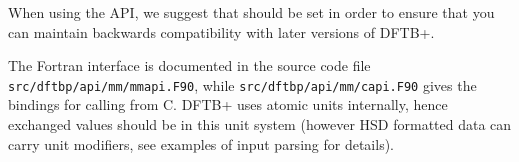 When using the API, we suggest that  should be set in order to
ensure that you can maintain backwards compatibility with later versions of
DFTB+.

The Fortran interface is documented in the source code file
\verb|src/dftbp/api/mm/mmapi.F90|, while \verb|src/dftbp/api/mm/capi.F90|
gives the bindings for calling from C. DFTB+ uses atomic units internally, hence
exchanged values should be in this unit system (however HSD formatted data can
carry unit modifiers, see examples of input parsing for details).
